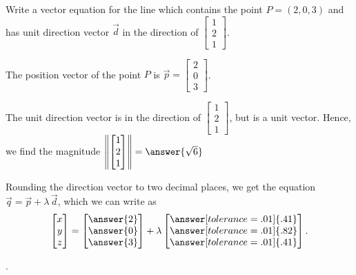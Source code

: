 \documentclass{ximera}
\begin{document}
\begin{example}\label{ex:line-point-and-direction-vector}

  Write a vector equation for the line which contains the point
  $P = (2,0,3)$ and has unit direction vector $\vec{d}$ in the direction of 
  $\begin{bmatrix}1\\2\\1\end{bmatrix}$.
\end{example}



\begin{solution}
  The position vector of the point $P$ is
  $\vec{p}=\begin{bmatrix}2\\0\\3\end{bmatrix}$. 

  The unit direction vector is in the direction of $\begin{bmatrix}1\\2\\1\end{bmatrix}$, but is a unit vector. Hence, we find the magnitude $\norm{\begin{bmatrix}1\\2\\1\end{bmatrix}}=\answer{\sqrt{6}}$
  
  Rounding the direction vector to two decimal places, we get the equation 
  $\vec{q}= \vec{p} + \lambda\,\vec{d}$, which we can write as
  \begin{equation*}
    \begin{bmatrix} x \\ y \\ z \end{bmatrix}
    = \begin{bmatrix} \answer{2} \\ \answer{0} \\ \answer{3} \end{bmatrix}
    + \lambda \begin{bmatrix} \answer[tolerance=.01]{.41} \\ \answer[tolerance=.01]{.82} \\ \answer[tolerance=.01]{.41} \end{bmatrix}.
  \end{equation*}
\end{solution}.
\end{document}

